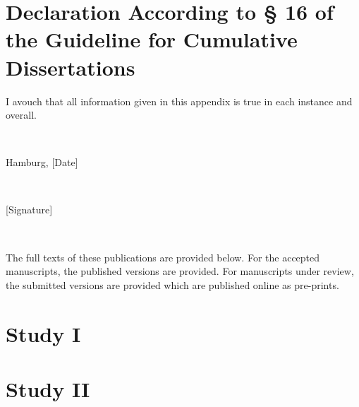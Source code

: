 \documentclass[
]{scrbook}
\begin{document}
\newpage

\section*{Declaration According to § 16 of the Guideline for Cumulative Dissertations}\label{declaration-according-to-16-of-the-guideline-for-cumulative-dissertations}

I avouch that all information given in this appendix is true in each instance and overall.

~

Hamburg, {[}Date{]}

~

{[}Signature{]}

~

The full texts of these publications are provided below. For the accepted manuscripts, the published versions are provided. For manuscripts under review, the submitted versions are provided which are published online as pre-prints.

\newpage

\section*{Study I}\label{studyI}

\begin{minipage}{\textwidth}

\end{minipage}



\newpage

\section*{Study II}\label{studyII}

\begin{minipage}{\textwidth}

\end{minipage}



\newpage
\end{document}
